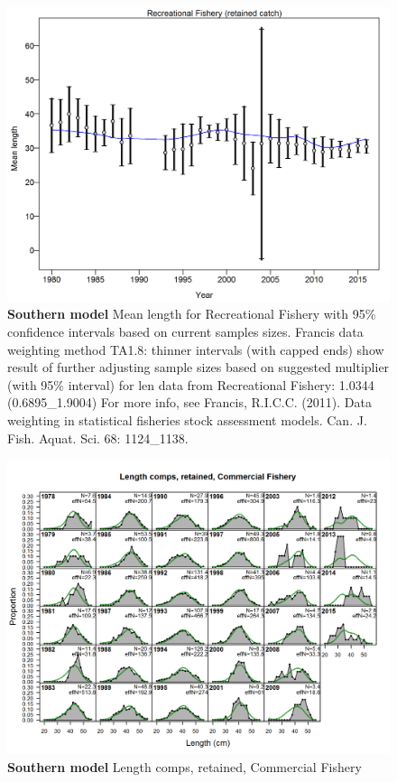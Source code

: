 \documentclass[12pt,]{article}
\begin{document}
\begin{figure}[htbp]
\centering
\includegraphics{./r4ss/plots_mod2/comp_lenfit_data_weighting_TA1.8_Recreational Fishery.png}
\caption{\textbf{Southern model} Mean length for Recreational Fishery
with 95\% confidence intervals based on current samples sizes. Francis
data weighting method TA1.8: thinner intervals (with capped ends) show
result of further adjusting sample sizes based on suggested multiplier
(with 95\% interval) for len data from Recreational Fishery: 1.0344
(0.6895\_1.9004) For more info, see Francis, R.I.C.C. (2011). Data
weighting in statistical fisheries stock assessment models. Can. J.
Fish. Aquat. Sci. 68: 1124\_1138.
\label{fig:mod2_4_comp_lenfit_data_weighting_TA1.8_Recreational Fishery}}
\end{figure}

\begin{figure}[htbp]
\centering
\includegraphics{./r4ss/plots_mod2/comp_lenfit_flt2mkt2.png}
\caption{\textbf{Southern model} Length comps, retained, Commercial
Fishery \label{fig:mod2_5_comp_lenfit_flt2mkt2}}
\end{figure}
\end{document}
